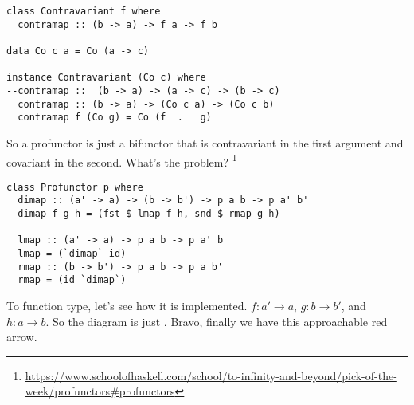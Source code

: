 \begin{lstlisting}
class Contravariant f where
  contramap :: (b -> a) -> f a -> f b

data Co c a = Co (a -> c)

instance Contravariant (Co c) where
--contramap ::  (b -> a) -> (a -> c) -> (b -> c)
  contramap :: (b -> a) -> (Co c a) -> (Co c b)
  contramap f (Co g) = Co (f  .   g)
\end{lstlisting}

So a profunctor is just a bifunctor that is contravariant in the first argument
and covariant in the second. What's the problem?
\footnote{\url{https://www.schoolofhaskell.com/school/to-infinity-and-beyond/pick-of-the-week/profunctors\#profunctors}}

\begin{lstlisting}
class Profunctor p where
  dimap :: (a' -> a) -> (b -> b') -> p a b -> p a' b'
  dimap f g h = (fst $ lmap f h, snd $ rmap g h)

  lmap :: (a' -> a) -> p a b -> p a' b
  lmap = (`dimap` id)
  rmap :: (b -> b') -> p a b -> p a b'
  rmap = (id `dimap`)
\end{lstlisting}

To function type, let's see how it is implemented. $f : a' \to a$, $g : b \to
b'$, and $h : a \to b$. So the diagram is just . Bravo, finally we have this
approachable red arrow.
